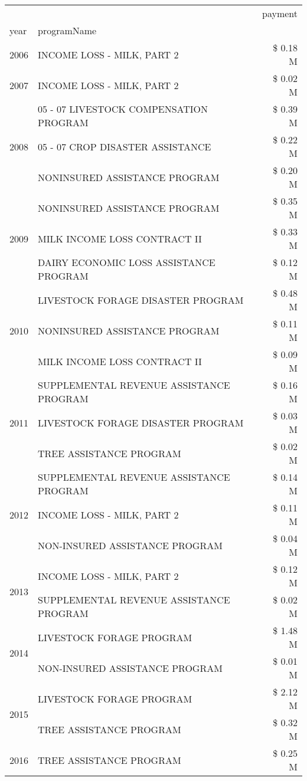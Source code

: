\begin{tabular}{llr}
\toprule
 &  & payment \\
year & programName &  \\
\midrule
2006 & INCOME LOSS - MILK, PART 2 & \$ 0.18 M \\
\cline{1-3}
2007 & INCOME LOSS - MILK, PART 2 & \$ 0.02 M \\
\cline{1-3}
\multirow[t]{3}{*}{2008} & 05 - 07 LIVESTOCK COMPENSATION PROGRAM & \$ 0.39 M \\
 & 05 - 07 CROP DISASTER ASSISTANCE & \$ 0.22 M \\
 & NONINSURED ASSISTANCE PROGRAM & \$ 0.20 M \\
\cline{1-3}
\multirow[t]{3}{*}{2009} & NONINSURED ASSISTANCE PROGRAM & \$ 0.35 M \\
 & MILK INCOME LOSS CONTRACT II & \$ 0.33 M \\
 & DAIRY ECONOMIC LOSS ASSISTANCE PROGRAM & \$ 0.12 M \\
\cline{1-3}
\multirow[t]{3}{*}{2010} & LIVESTOCK FORAGE DISASTER  PROGRAM & \$ 0.48 M \\
 & NONINSURED ASSISTANCE PROGRAM & \$ 0.11 M \\
 & MILK INCOME LOSS CONTRACT II & \$ 0.09 M \\
\cline{1-3}
\multirow[t]{3}{*}{2011} & SUPPLEMENTAL REVENUE ASSISTANCE PROGRAM & \$ 0.16 M \\
 & LIVESTOCK FORAGE DISASTER PROGRAM & \$ 0.03 M \\
 & TREE ASSISTANCE PROGRAM & \$ 0.02 M \\
\cline{1-3}
\multirow[t]{3}{*}{2012} & SUPPLEMENTAL REVENUE ASSISTANCE PROGRAM & \$ 0.14 M \\
 & INCOME LOSS - MILK, PART 2 & \$ 0.11 M \\
 & NON-INSURED ASSISTANCE PROGRAM & \$ 0.04 M \\
\cline{1-3}
\multirow[t]{2}{*}{2013} & INCOME LOSS - MILK, PART 2 & \$ 0.12 M \\
 & SUPPLEMENTAL REVENUE ASSISTANCE PROGRAM & \$ 0.02 M \\
\cline{1-3}
\multirow[t]{2}{*}{2014} & LIVESTOCK FORAGE PROGRAM & \$ 1.48 M \\
 & NON-INSURED ASSISTANCE PROGRAM & \$ 0.01 M \\
\cline{1-3}
\multirow[t]{2}{*}{2015} & LIVESTOCK FORAGE PROGRAM & \$ 2.12 M \\
 & TREE ASSISTANCE PROGRAM & \$ 0.32 M \\
\cline{1-3}
\multirow[t]{3}{*}{2016} & TREE ASSISTANCE PROGRAM                       & \$ 0.25 M \\

\end{tabular}
